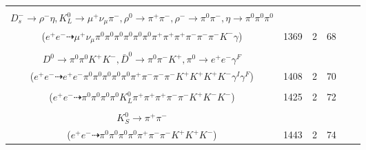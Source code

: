 \documentclass[landscape]{article}
\newcounter{rownumbers}
\newcommand\rn{\stepcounter{rownumbers}\arabic{rownumbers}}
\newcommand{\EOLP}{\\ \hline} %
\newcommand{\topoTags}[1]{#1} %
\begin{document}
\begin{longtable}{clcccc}
\rn & \makecell[l]{ $ 
e^{+} e^{-} \rightarrow \pi^{+} K^{*} D^{*0} D_{s}^{*-} ,
K^{*} \rightarrow \pi^{0} K^{0} ,
D^{*0} \rightarrow \pi^{0} D^{0} ,
D_{s}^{*-} \rightarrow D_{s}^{-} \gamma ,
K^{0} \rightarrow K_{L}^{0} ,
D^{0} \rightarrow \rho^{0} \pi^{+} K^{-} ,
$ \\ $
D_{s}^{-} \rightarrow \rho^{-} \eta ,
K_{L}^{0} \rightarrow \mu^{+} \nu_{\mu} \pi^{-} ,
\rho^{0} \rightarrow \pi^{+} \pi^{-} ,
\rho^{-} \rightarrow \pi^{0} \pi^{-} ,
\eta \rightarrow \pi^{0} \pi^{0} \pi^{0} 
$ \\ ($
e^{+} e^{-} \dashrightarrow \mu^{+} \nu_{\mu} \pi^{0} \pi^{0} \pi^{0} \pi^{0} \pi^{0} \pi^{0} \pi^{+} \pi^{+} \pi^{+} \pi^{-} \pi^{-} \pi^{-} K^{-} \gamma 
$) } & \topoTags{1369 & }2 & 68 \EOLP

\rn & \makecell[l]{ $ 
e^{+} e^{-} \rightarrow \rho^{-} \bar{K}^{0} K^{+} D^{*+} D^{*-} \gamma^{I} ,
\rho^{-} \rightarrow \pi^{0} \pi^{-} ,
\bar{K}^{0} \rightarrow K_{S}^{0} ,
D^{*+} \rightarrow \pi^{+} D^{0} ,
D^{*-} \rightarrow \pi^{-} \bar{D}^{0} ,
K_{S}^{0} \rightarrow \pi^{0} \pi^{0} ,
$ \\ $
D^{0} \rightarrow \pi^{0} \pi^{0} K^{+} K^{-} ,
\bar{D}^{0} \rightarrow \pi^{0} \pi^{-} K^{+} ,
\pi^{0} \rightarrow e^{+} e^{-} \gamma^{F} 
$ \\ ($
e^{+} e^{-} \dashrightarrow e^{+} e^{-} \pi^{0} \pi^{0} \pi^{0} \pi^{0} \pi^{0} \pi^{+} \pi^{-} \pi^{-} \pi^{-} K^{+} K^{+} K^{+} K^{-} \gamma^{I} \gamma^{F} 
$) } & \topoTags{1408 & }2 & 70 \EOLP

\rn & \makecell[l]{ $ 
e^{+} e^{-} \rightarrow \pi^{+} \omega K^{+} K^{-} D^{-} D^{0} ,
\omega \rightarrow \pi^{0} \pi^{+} \pi^{-} ,
D^{-} \rightarrow \pi^{0} K_{L}^{0} \pi^{-} ,
D^{0} \rightarrow \pi^{0} \pi^{+} K^{*-} ,
K^{*-} \rightarrow \pi^{0} K^{-} 
$ \\ ($
e^{+} e^{-} \dashrightarrow \pi^{0} \pi^{0} \pi^{0} \pi^{0} K_{L}^{0} \pi^{+} \pi^{+} \pi^{+} \pi^{-} \pi^{-} K^{+} K^{-} K^{-} 
$) } & \topoTags{1425 & }2 & 72 \EOLP

\rn & \makecell[l]{ $ 
e^{+} e^{-} \rightarrow K^{+} K^{-} D^{0} \bar{D}^{*0} ,
D^{0} \rightarrow \pi^{0} \bar{K}^{*} ,
\bar{D}^{*0} \rightarrow \pi^{0} \bar{D}^{0} ,
\bar{K}^{*} \rightarrow \pi^{0} \bar{K}^{0} ,
\bar{D}^{0} \rightarrow \pi^{0} \pi^{-} K^{+} ,
\bar{K}^{0} \rightarrow K_{S}^{0} ,
$ \\ $
K_{S}^{0} \rightarrow \pi^{+} \pi^{-} 
$ \\ ($
e^{+} e^{-} \dashrightarrow \pi^{0} \pi^{0} \pi^{0} \pi^{0} \pi^{+} \pi^{-} \pi^{-} K^{+} K^{+} K^{-} 
$) } & \topoTags{1443 & }2 & 74 \EOLP


\end{longtable}
\end{document}
